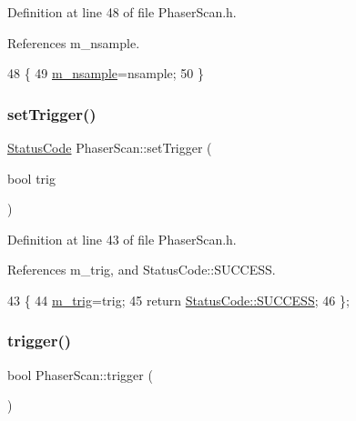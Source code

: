Definition at line 48 of file Phaser\+Scan.\+h.



References m\+\_\+nsample.


\begin{DoxyCode}
48                              \{
49     \hyperlink{classPhaserScan_a6c2089bb98fa8a897430b17ddb052447}{m\_nsample}=nsample;
50   \}
\end{DoxyCode}
\mbox{\label{classPhaserScan_a8e9d2bff400546f71d0c24cd3658d09e}} 
\subsubsection{\texorpdfstring{set\+Trigger()}{setTrigger()}}
{\footnotesize\ttfamily \hyperlink{classStatusCode}{Status\+Code} Phaser\+Scan\+::set\+Trigger (\begin{DoxyParamCaption}\item[{bool}]{trig }\end{DoxyParamCaption})\hspace{0.3cm}{\ttfamily [inline]}}



Definition at line 43 of file Phaser\+Scan.\+h.



References m\+\_\+trig, and Status\+Code\+::\+S\+U\+C\+C\+E\+SS.


\begin{DoxyCode}
43                                    \{
44     \hyperlink{classPhaserScan_ab3fd16cfcce13a09f5c1e91d96de60e6}{m\_trig}=trig; 
45     \textcolor{keywordflow}{return} \hyperlink{classStatusCode_a6f565cbeadc76d14c72f047e5e85eb4badd0da38d3ba0d922efd1f4619bc37ad8}{StatusCode::SUCCESS};
46   \};
\end{DoxyCode}
\mbox{\label{classPhaserScan_a6ae0b3511064540555ef9770c63febc4}} 
\subsubsection{\texorpdfstring{trigger()}{trigger()}}
{\footnotesize\ttfamily bool Phaser\+Scan\+::trigger (\begin{DoxyParamCaption}{ }\end{DoxyParamCaption})\hspace{0.3cm}{\ttfamily [inline]}}



